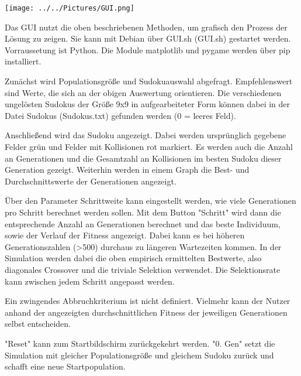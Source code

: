 \texttt{[image: ../../Pictures/GUI.png]}

\noindent Das GUI nutzt die oben beschriebenen Methoden, um grafisch den Prozess der Lösung zu zeigen. 
Sie kann mit Debian über GUI.sh (GUI.sh) gestartet werden.
Vorraussetung ist Python. Die Module matplotlib und pygame werden über pip installiert.

\noindent Zunächst wird Populationsgröße und Sudokuauswahl abgefragt. 
Empfehlenswert sind Werte, die sich an der obigen Auswertung orientieren.
Die verschiedenen ungelösten Sudokus der Größe 9x9 in aufgearbeiteter Form können dabei in der Datei Sudokus (Sudokus.txt) gefunden werden (0 = leeres Feld).

\noindent Anschließend wird das Sudoku angezeigt. Dabei werden ursprünglich gegebene Felder grün und Felder mit Kollisionen rot markiert. 
Es werden auch die Anzahl an Generationen und die Gesamtzahl an Kollisionen im besten Sudoku dieser Generation gezeigt. Weiterhin werden in einem Graph die Best- und Durchschnittswerte der Generationen angezeigt.

\noindent Über den Parameter Schrittweite kann eingestellt werden, wie viele Generationen pro Schritt berechnet werden sollen. 
Mit dem Button "Schritt" wird dann die entsprechende Anzahl an Generationen berechnet und das beste Individuum, sowie der Verlauf der Fitness angezeigt. Dabei kann es bei höheren Generationszahlen (>500) durchaus zu längeren Wartezeiten kommen.
\newpage
\noindent In der Simulation werden dabei die oben empirisch ermittelten Bestwerte, also diagonales Crossover und die triviale Selektion verwendet. Die Selektionsrate kann zwischen jedem Schritt angepasst werden.

\noindent Ein zwingendes Abbruchkriterium ist nicht definiert. Vielmehr kann der Nutzer anhand der angezeigten durchschnittlichen Fitness der jeweiligen Generationen selbst entscheiden.

 "Reset" kann zum Startbildschirm zurückgekehrt werden.
"0. Gen" setzt die Simulation mit gleicher Populationsgröße und gleichem Sudoku zurück und schafft eine neue Startpopulation.
